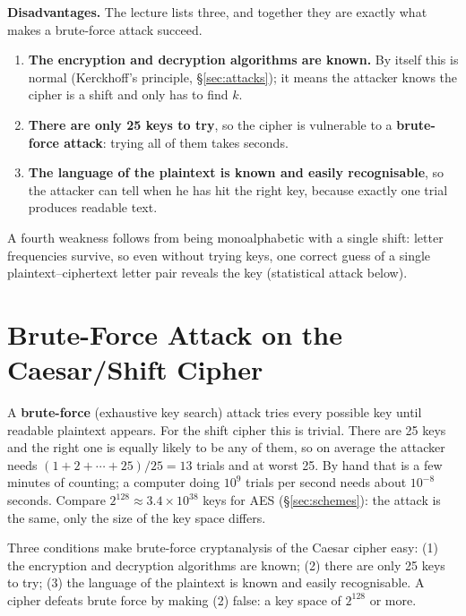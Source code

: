 \textbf{Disadvantages.} The lecture lists three, and together they are exactly what makes a brute-force attack succeed.
\begin{enumerate}[leftmargin=1.5em]
  \item \textbf{The encryption and decryption algorithms are known.} By itself this is normal (Kerckhoff's principle, \S\ref{sec:attacks}); it means the attacker knows the cipher is a shift and only has to find $k$.
  \item \textbf{There are only 25 keys to try}, so the cipher is vulnerable to a \textbf{brute-force attack}: trying all of them takes seconds.
  \item \textbf{The language of the plaintext is known and easily recognisable}, so the attacker can tell when he has hit the right key, because exactly one trial produces readable text.
\end{enumerate}
A fourth weakness follows from being monoalphabetic with a single shift: letter frequencies survive, so even without trying keys, one correct guess of a single plaintext--ciphertext letter pair reveals the key (statistical attack below).

\section{Brute-Force Attack on the Caesar/Shift Cipher}\label{sec:bruteforce}

A \textbf{brute-force} (exhaustive key search) attack tries every possible key until readable plaintext appears. For the shift cipher this is trivial. There are 25 keys and the right one is equally likely to be any of them, so on average the attacker needs $(1 + 2 + \cdots + 25)/25 = 13$ trials and at worst 25. By hand that is a few minutes of counting; a computer doing $10^9$ trials per second needs about $10^{-8}$ seconds. Compare $2^{128} \approx 3.4 \times 10^{38}$ keys for AES (\S\ref{sec:schemes}): the attack is the same, only the size of the key space differs.

\begin{mustknow}
Three conditions make brute-force cryptanalysis of the Caesar cipher easy: (1) the encryption and decryption algorithms are known; (2) there are only 25 keys to try; (3) the language of the plaintext is known and easily recognisable. A cipher defeats brute force by making (2) false: a key space of $2^{128}$ or more.
\end{mustknow}

